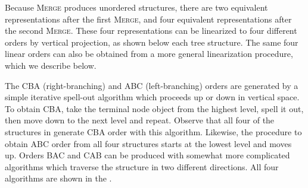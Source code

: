   Because \textsc{Merge} produces unordered structures, there are two equivalent representations after the first \textsc{Merge}, and four equivalent representations after the second \textsc{Merge}. These four representations can be linearized to four different orders by vertical projection, as shown below each tree structure. The same four linear orders can also be obtained from a more general linearization procedure, which we describe below.

  The CBA (right-branching) and ABC (left-branching) orders are generated by a simple iterative spell-out algorithm which proceeds up or down in vertical space. To obtain CBA, take the terminal node object from the highest level, spell it out, then move down to the next level and repeat. Observe that all four of the structures in  generate CBA order with this algorithm. Likewise, the procedure to obtain ABC order from all four structures starts at the lowest level and moves up. Orders BAC and CAB can be produced with somewhat more complicated algorithms which traverse the structure in two different directions. All four algorithms are shown in the {\tablebelow}. 


